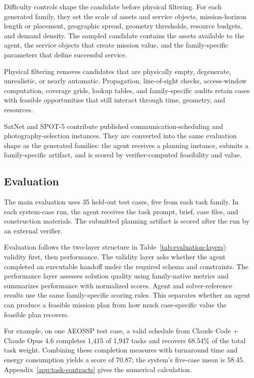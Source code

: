 \documentclass[11pt]{article}
\begin{document}
Difficulty controls shape the candidate before physical filtering. For each generated family, they set the scale of assets and service objects, mission-horizon length or placement, geographic spread, geometry thresholds, resource budgets, and demand density. The sampled candidate contains the assets available to the agent, the service objects that create mission value, and the family-specific parameters that define successful service.

Physical filtering removes candidates that are physically empty, degenerate, unrealistic, or nearly automatic. Propagation, line-of-sight checks, access-window computation, coverage grids, lookup tables, and family-specific audits retain cases with feasible opportunities that still interact through time, geometry, and resources.

SatNet and SPOT-5 contribute published communication-scheduling and photography-selection instances. They are converted into the same evaluation shape as the generated families: the agent receives a planning instance, submits a family-specific artifact, and is scored by verifier-computed feasibility and value.

\subsection{Evaluation}
\label{sec:evaluation}

The main evaluation uses 35 held-out test cases, five from each task family. In each system-case run, the agent receives the task prompt, brief, case files, and construction materials. The submitted planning artifact is scored after the run by an external verifier.

Evaluation follows the two-layer structure in Table~\ref{tab:evaluation-layers}: validity first, then performance. The validity layer asks whether the agent completed an executable handoff under the required schema and constraints. The performance layer assesses solution quality using family-native metrics and summarizes performance with normalized scores. Agent and solver-reference results use the same family-specific scoring rules. This separates whether an agent can produce a feasible mission plan from how much case-specific value the feasible plan recovers.

For example, on one AEOSSP test case, a valid schedule from Claude Code + Claude Opus 4.6 completes 1,415 of 1,947 tasks and recovers 68.54\% of the total task weight. Combining these completion measures with turnaround time and energy consumption yields a score of 70.87; the system's five-case mean is 58.45. Appendix~\ref{app:task-contracts} gives the numerical calculation.
\end{document}
